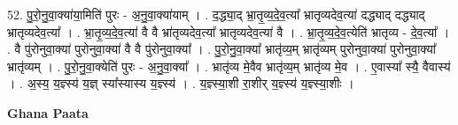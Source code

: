 \documentclass[17pt]{extarticle}
\begin{document}
52. पु॒रो॒नु॒वा॒क्या॑या॒मिति॑ पुरः - अ॒नु॒वा॒क्या॑याम् । . द॒द्ध्या॒द् भ्रा॒तृ॒व्य॒दे॒व॒त्या᳚ भ्रातृव्यदेव॒त्या॑ दद्ध्याद् दद्ध्याद् भ्रातृव्यदेव॒त्या᳚ । . भ्रा॒तृ॒व्य॒दे॒व॒त्या॑ वै वै भ्रा॑तृव्यदेव॒त्या᳚ भ्रातृव्यदेव॒त्या॑ वै । . भ्रा॒तृ॒व्य॒दे॒व॒त्येति॑ भ्रातृव्य - दे॒व॒त्या᳚ । . वै पु॑रोनुवा॒क्या॑ पुरोनुवा॒क्या॑ वै वै पु॑रोनुवा॒क्या᳚ । . पु॒रो॒नु॒वा॒क्या᳚ भ्रातृ॑व्य॒म् भ्रातृ॑व्यम् पुरोनुवा॒क्या॑ पुरोनुवा॒क्या᳚ भ्रातृ॑व्यम् । . पु॒रो॒नु॒वा॒क्येति॑ पुरः - अ॒नु॒वा॒क्या᳚ । . भ्रातृ॑व्य मे॒वैव भ्रातृ॑व्य॒म् भ्रातृ॑व्य मे॒व । . ए॒वास्या᳚ स्यै॒ वैवास्य॑ । . अ॒स्य॒ य॒ज्ञ्स्य॑ य॒ज्ञ् स्या᳚स्यास्य य॒ज्ञ्स्य॑ । . य॒ज्ञ्स्या॒शी रा॒शीर् य॒ज्ञ्स्य॑ य॒ज्ञ्स्या॒शीः । \newline

\textbf{Ghana Paata } \newline
\end{document}
